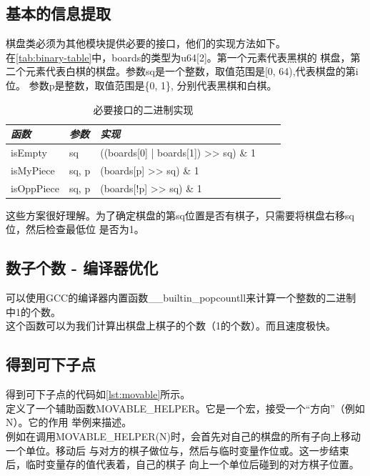 \documentclass[a4paper]{article}
\begin{document}
\subsection{基本的信息提取}
棋盘类必须为其他模块提供必要的接口，他们的实现方法如下。\\

在\autoref{tab:binary-table}中，boards的类型为u64[2]。第一个元素代表黑棋的
棋盘，第二个元素代表白棋的棋盘。参数sq是一个整数，取值范围是[0, 64),代表棋盘的第i位。
参数p是整数，取值范围是\{0, 1\}, 分别代表黑棋和白棋。
\begin{table}[!htb]
\caption{必要接口的二进制实现}\label{tab:binary-table}
\centering
\begin{tabular}{@{} *5l @{}}
    \toprule
\emph{函数} & \emph{参数} & \emph{实现}&& \\
    \midrule
    isEmpty  & sq & ((boards[0] | boards[1]) >> sq) \& 1 \\
    isMyPiece & sq, p & (boards[p] >> sq) \& 1 \\
    isOppPiece & sq, p & (boards[!p] >> sq) \&  1 \\
    \bottomrule
\hline
\end{tabular}
\end{table}

这些方案很好理解。为了确定棋盘的第sq位置是否有棋子，只需要将棋盘右移sq位，然后检查最低位
是否为1。

\subsection{数子个数 - 编译器优化}
可以使用GCC的编译器内置函数\_\_builtin\_popcountll来计算一个整数的二进制中1的个数。\\

这个函数可以为我们计算出棋盘上棋子的个数（1的个数）。而且速度极快。

\subsection{得到可下子点}
得到可下子点的代码如\autoref{lst:movable}所示。\\

定义了一个辅助函数MOVABLE\_HELPER。它是一个宏，接受一个``方向''（例如N）。它的作用
举例来描述。\\

例如在调用MOVABLE\_HELPER(N)时，会首先对自己的棋盘的所有子向上移动一个单位。移动后
与对方的棋子做位与，然后与临时变量作位或。这一步结束后，临时变量存的值代表着，自己的棋子
向上一个单位后碰到的对方棋子位置。\\
\end{document}
